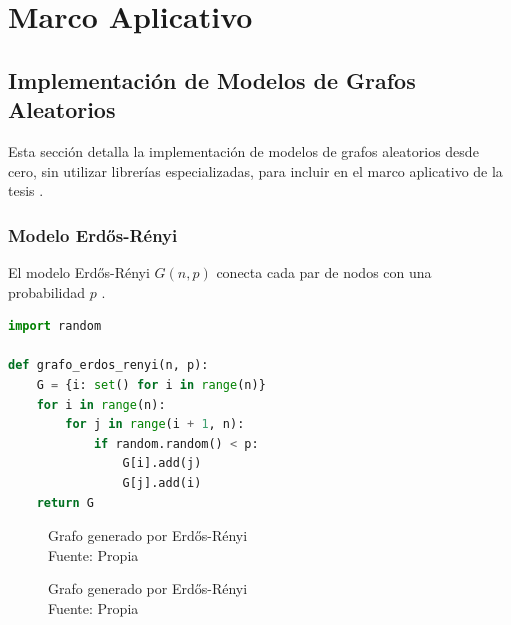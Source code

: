 \chapter{Marco Aplicativo}

\section{Implementación de Modelos de Grafos Aleatorios}
Esta sección detalla la implementación de modelos de grafos aleatorios desde cero, sin utilizar librerías especializadas, para incluir en el marco aplicativo de la tesis .


\subsection{Modelo Erdős-Rényi}
El modelo Erdős-Rényi \( G(n, p) \) conecta cada par de nodos con una probabilidad \( p \) .

\begin{lstlisting}[language=Python]
import random
    
def grafo_erdos_renyi(n, p):
    G = {i: set() for i in range(n)}
    for i in range(n):
        for j in range(i + 1, n):
            if random.random() < p:
                G[i].add(j)
                G[j].add(i)
    return G
\end{lstlisting}

\begin{figure}
\caption{Grafo generado por Erdős-Rényi\\Fuente: Propia}
\end{figure}

\begin{figure}
\caption{Grafo generado por Erdős-Rényi\\Fuente: Propia}
\end{figure}

